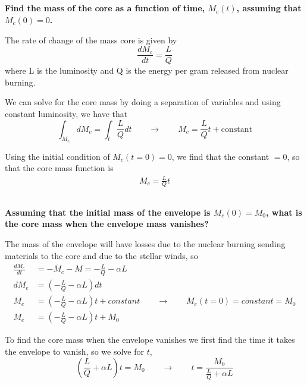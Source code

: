 \subsection{}
\textbf{Find the mass of the core as a function of time, $M_c(t)$, assuming that $M_c(0) = 0$.}

The rate of change of the mass core is given by 
\begin{equation*}
    \frac{dM_c}{dt} = \frac{L}{Q}
\end{equation*}
where L is the luminosity and Q is the energy per gram released from nuclear burning. 

We can solve for the core mass by doing a separation of variables and using constant luminosity, we have that
\begin{equation*}
    \int_{M_c} dM_c = \int_t \frac{L}{Q}dt \qquad\rightarrow
    \qquad M_c = \frac{L}{Q}t + \mathrm{constant}
\end{equation*}

Using the initial condition of $M_c(t=0)=0$, we find that the constant $ = 0$, so that the core mass function is
\begin{align}
    M_c = \frac{L}{Q}t
\end{align}


\subsection{}
\textbf{Assuming that the initial mass of the envelope is $M_e(0) = M_0$, what is the core mass when the envelope mass vanishes?}

The mass of the envelope will have losses due to the nuclear burning sending materials to the core and due to the stellar winds, so 
\begin{align*}
    \frac{dM_e}{dt} &= -\Dot{M_c}-\Dot{M} = -\frac{L}{Q} - \alpha L\\
    dM_e &= \left(-\frac{L}{Q} -\alpha L\right)dt \\
    M_e &= \left(-\frac{L}{Q} -\alpha L\right)t + constant \qquad\rightarrow\qquad M_e(t=0) = constant = M_0 \\
    M_e &= \left(-\frac{L}{Q} -\alpha L\right)t + M_0
\end{align*}

To find the core mass when the envelope vanishes we first find the time it takes the envelope to vanish, so we solve for $t$,
\begin{equation*}
    \left(\frac{L}{Q} +\alpha L\right)t = M_0 \qquad\rightarrow\qquad t = \frac{M_0}{\frac{L}{Q} +\alpha L}
\end{equation*}

